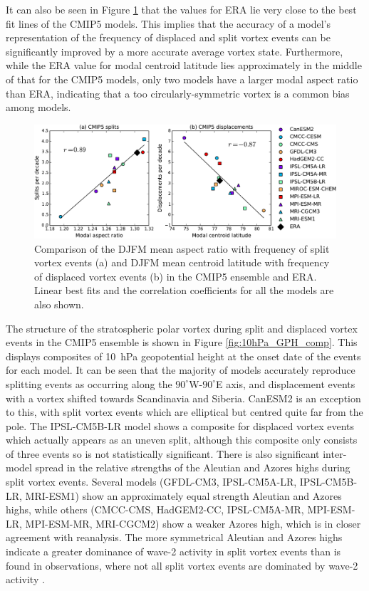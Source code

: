 It can also be seen in Figure \ref{fig:cmip5_moments_scatter} that the values
for ERA lie very close to the best fit lines of the CMIP5 models. This implies
that the accuracy of a model's representation of the frequency of displaced and
split vortex events can be significantly improved by a more accurate average
vortex state. Furthermore, while the ERA value for modal centroid latitude lies
approximately in the middle of that for the CMIP5 models, only two models have a
larger modal aspect ratio than ERA, indicating that a too circularly-symmetric
vortex is a common bias among models.

\begin{figure}
 \centering
 \noindent\includegraphics[width=\textwidth]{figures/chapter-models/CMIP5_moments_scatter.pdf}
 \caption[Comparison of moment diagnostics and frequency of split and displaced
 vortex events.]{Comparison of the DJFM mean aspect ratio with frequency of
   split vortex events (a) and DJFM mean centroid latitude with frequency of
   displaced vortex events (b) in the CMIP5 ensemble and ERA. Linear best fits
   and the correlation coefficients for all the models are also shown.}
 \label{fig:cmip5_moments_scatter}
\end{figure}

The structure of the stratospheric polar vortex during split and displaced
vortex events in the CMIP5 ensemble is shown in Figure
\ref{fig:10hPa_GPH_comp}. This displays composites of 10~hPa geopotential height
at the onset date of the events for each model. It can be seen that the majority
of models accurately reproduce splitting events as occurring along the
$90^{\circ}$W-$90^{\circ}$E axis, and displacement events with a vortex shifted
towards Scandinavia and Siberia. CanESM2 is an exception to this, with split
vortex events which are elliptical but centred quite far from the pole. The
IPSL-CM5B-LR model shows a composite for displaced vortex events which actually
appears as an uneven split, although this composite only consists of three
events so is not statistically significant. There is also significant
inter-model spread in the relative strengths of the Aleutian and Azores highs
during split vortex events. Several models (GFDL-CM3, IPSL-CM5A-LR,
IPSL-CM5B-LR, MRI-ESM1) show an approximately equal strength Aleutian and Azores
highs, while others (CMCC-CMS, HadGEM2-CC, IPSL-CM5A-MR, MPI-ESM-LR, MPI-ESM-MR,
MRI-CGCM2) show a weaker Azores high, which is in closer agreement with
reanalysis. The more symmetrical Aleutian and Azores highs indicate a greater
dominance of wave-2 activity in split vortex events than is found in
observations, where not all split vortex events are dominated by wave-2 activity
\citep{Waugh1997,Mitchell2013}.


